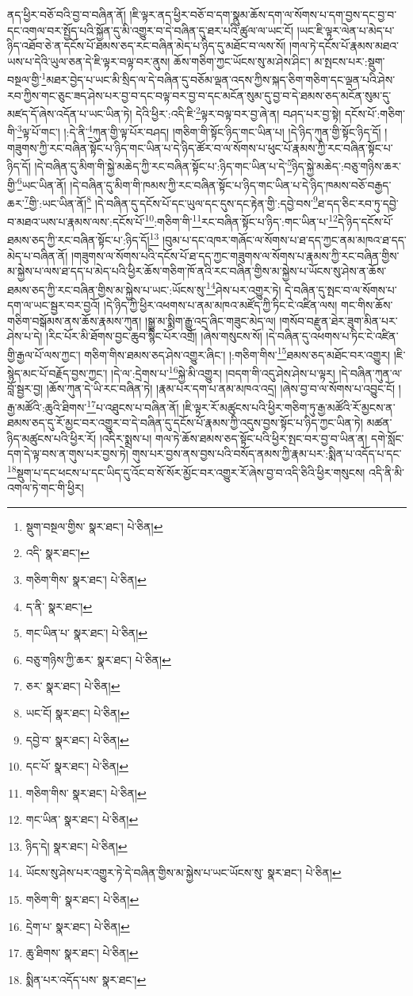 ནད་ཕྱིར་བཅོ་བའི་བྱ་བ་བཞིན་ནོ། །ཇི་ལྟར་ནད་ཕྱིར་བཅོ་བ་དག་སྣུམ་ཆོས་དག་ལ་སོགས་པ་དག་བྱས་དང་བྱ་བ་དང་འགལ་བར་སྤྱོད་པའི་སྐྱོན་དུ་མི་འགྱུར་བ་དེ་བཞིན་དུ་ཐར་པའི་ཚུལ་ལ་ཡང་ངོ། །ཡང་ཇི་ལྟར་ལེན་པ་མེད་པ་ཉིད་འཐོབ་ཅེ་ན་དངོས་པོ་ཐམས་ཅད་རང་བཞིན་མེད་པ་ཉིད་དུ་མཐོང་བ་ལས་སོ། །གལ་ཏེ་དངོས་པོ་རྣམས་མཐའ་ཡས་པ་དེའི་ཡུལ་ཅན་དེ་ཇི་ལྟར་བལྟ་བར་ནུས། ཆོས་གཅིག་ཀྱང་ཡོངས་སུ་མ་ཤེས་ཤིང་། མ་སྤངས་པར་:སྡུག་བསྔལ་གྱི་\footnote{སྡུག་བསྔལ་གྱིས་  སྣར་ཐང་།  པེ་ཅིན། }མཐར་བྱེད་པ་ཡང་མི་སྲིད་ལ་དེ་བཞིན་དུ་བཅོམ་ལྡན་འདས་ཀྱིས་སྐད་ཅིག་གཅིག་དང་ལྡན་པའི་ཤེས་རབ་ཀྱིས་གང་ཅུང་ཟད་ཤེས་པར་བྱ་བ་དང་བལྟ་བར་བྱ་བ་དང་མངོན་སུམ་དུ་བྱ་བ་དེ་ཐམས་ཅད་མངོན་སུམ་དུ་མཛད་དོ་ཞེས་འདོན་པ་ཡང་ཡིན་ཏེ། དེའི་ཕྱིར་:འདི་ཇི་\footnote{འདི་  སྣར་ཐང་། }ལྟར་བལྟ་བར་བྱ་ཞེ་ན། བཤད་པར་བྱ་སྟེ། དངོས་པོ་:གཅིག་གི་\footnote{གཅིག་གིས་  སྣར་ཐང་།  པེ་ཅིན། }ལྟ་པོ་གང་། །:དེ་ནི་\footnote{ད་ནི་  སྣར་ཐང་། }ཀུན་གྱི་ལྟ་པོར་བཤད། །གཅིག་གི་སྟོང་ཉིད་གང་ཡིན་པ། །དེ་ཉིད་ཀུན་གྱི་སྟོང་ཉིད་དོ། །གཟུགས་ཀྱི་རང་བཞིན་སྟོང་པ་ཉིད་གང་ཡིན་པ་དེ་ཉིད་ཚོར་བ་ལ་སོགས་པ་ཕུང་པོ་རྣམས་ཀྱི་རང་བཞིན་སྟོང་པ་ཉིད་དོ། །དེ་བཞིན་དུ་མིག་གི་སྐྱེ་མཆེད་ཀྱི་རང་བཞིན་སྟོང་པ་:ཉིད་གང་ཡིན་པ་དེ་\footnote{གང་ཡིན་པ་  སྣར་ཐང་།  པེ་ཅིན། }ཉིད་སྐྱེ་མཆེད་:བཅུ་གཉིས་ཆར་གྱི་\footnote{བཅུ་གཉིས་ཀྱི་ཆར་  སྣར་ཐང་།  པེ་ཅིན། }ཡང་ཡིན་ནོ། །དེ་བཞིན་དུ་མིག་གི་ཁམས་ཀྱི་རང་བཞིན་སྟོང་པ་ཉིད་གང་ཡིན་པ་དེ་ཉིད་ཁམས་བཅོ་བརྒྱད་ཆར་\footnote{ཅར་  སྣར་ཐང་།  པེ་ཅིན། }གྱི་:ཡང་ཡིན་ནོ།\footnote{ཡང་ངོ།  སྣར་ཐང་།  པེ་ཅིན། } །དེ་བཞིན་དུ་དངོས་པོ་དང་ཡུལ་དང་དུས་དང་རྟེན་གྱི་:དབྱེ་བས་\footnote{དབྱེ་བ་  སྣར་ཐང་།  པེ་ཅིན། }ཐ་དད་ཅིང་རབ་ཏུ་དབྱེ་བ་མཐའ་ཡས་པ་རྣམས་ལས་:དངོས་པོ་\footnote{དང་པོ་  སྣར་ཐང་།  པེ་ཅིན། }:གཅིག་གི་\footnote{གཅིག་གིས་  སྣར་ཐང་།  པེ་ཅིན། }རང་བཞིན་སྟོང་པ་ཉིད་:གང་ཡིན་པ་\footnote{གང་ཡིན་  སྣར་ཐང་།  པེ་ཅིན། }དེ་ཉིད་དངོས་པོ་ཐམས་ཅད་ཀྱི་རང་བཞིན་སྟོང་པ་:ཉིད་དོ།\footnote{ཉིད་དེ།  སྣར་ཐང་།  པེ་ཅིན། } །བུམ་པ་དང་འཁར་གཞོང་ལ་སོགས་པ་ཐ་དད་ཀྱང་ནམ་མཁའ་ཐ་དད་མེད་པ་བཞིན་ནོ། །གཟུགས་ལ་སོགས་པའི་དངོས་པོ་ཐ་དད་ཀྱང་གཟུགས་ལ་སོགས་པ་རྣམས་ཀྱི་རང་བཞིན་གྱིས་མ་སྐྱེས་པ་ལས་ཐ་དད་པ་མེད་པའི་ཕྱིར་ཆོས་གཅིག་ཁོ་ནའི་རང་བཞིན་གྱིས་མ་སྐྱེས་པ་ཡོངས་སུ་ཤེས་ན་ཆོས་ཐམས་ཅད་ཀྱི་རང་བཞིན་གྱིས་མ་སྐྱེས་པ་ཡང་:ཡོངས་སུ་\footnote{ཡོངས་སུ་ཤེས་པར་འགྱུར་ཏེ་དེ་བཞིན་གྱིས་མ་སྐྱེས་པ་ཡང་ཡོངས་སུ་  སྣར་ཐང་།  པེ་ཅིན། }ཤེས་པར་འགྱུར་ཏེ། དེ་བཞིན་དུ་སྤང་བ་ལ་སོགས་པ་དག་ལ་ཡང་སྦྱར་བར་བྱའོ། །དེ་ཉིད་ཀྱི་ཕྱིར་འཕགས་པ་ནམ་མཁའ་མཛོད་ཀྱི་ཏིང་ངེ་འཛིན་ལས། གང་གིས་ཆོས་གཅིག་བསྒོམས་ནས་ཆོས་རྣམས་ཀུན། །སྒྱུ་མ་སྨིག་རྒྱུ་འདྲ་ཞིང་གཟུང་མེད་ལ། །གསོབ་བརྫུན་ཐེར་ཟུག་མིན་པར་ཤེས་པ་དེ། །རིང་པོར་མི་ཐོགས་བྱང་ཆུབ་སྙིང་པོར་འགྲོ། །ཞེས་གསུངས་སོ། །དེ་བཞིན་དུ་འཕགས་པ་ཏིང་ངེ་འཛིན་གྱི་རྒྱལ་པོ་ལས་ཀྱང་། གཅིག་གིས་ཐམས་ཅད་ཤེས་འགྱུར་ཞིང་། །:གཅིག་གིས་\footnote{གཅིག་གི་  སྣར་ཐང་།  པེ་ཅིན། }ཐམས་ཅད་མཐོང་བར་འགྱུར། །ཇི་སྙེད་མང་པོ་བརྗོད་བྱས་ཀྱང་། །དེ་ལ་:དྲེགས་པ་\footnote{དྲེག་པ་  སྣར་ཐང་།  པེ་ཅིན། }སྐྱེ་མི་འགྱུར། །བདག་གི་འདུ་ཤེས་ཤེས་པ་ལྟར། །དེ་བཞིན་ཀུན་ལ་བློ་སྦྱར་བྱ། །ཆོས་ཀུན་དེ་ཡི་རང་བཞིན་ཏེ། །རྣམ་པར་དག་པ་ནམ་མཁའ་འདྲ། །ཞེས་བྱ་བ་ལ་སོགས་པ་འབྱུང་ངོ། །རྒྱ་མཚོའི་:ཆུའི་ཐིགས་\footnote{ཆུ་ཐིགས་  སྣར་ཐང་།  པེ་ཅིན། }པ་འཐུངས་པ་བཞིན་ནོ། །ཇི་ལྟར་རོ་མཚུངས་པའི་ཕྱིར་གཅིག་ཏུ་རྒྱ་མཚོའི་རོ་མྱངས་ན་ཐམས་ཅད་དུ་རོ་མྱང་བར་འགྱུར་བ་དེ་བཞིན་དུ་དངོས་པོ་རྣམས་ཀྱི་འདུས་བྱས་སྟོང་པ་ཉིད་ཀྱང་ཡིན་ཏེ། མཚན་ཉིད་མཚུངས་པའི་ཕྱིར་རོ། །འདིར་སྨྲས་པ། གལ་ཏེ་ཆོས་ཐམས་ཅད་སྟོང་པའི་ཕྱིར་སྤང་བར་བྱ་བ་ཡིན་ན། དགེ་སློང་དག་དེ་ལྟ་བས་ན་གུས་པར་བྱས་ཏེ། གུས་པར་བྱས་ནས་བྱས་པའི་བསོད་ནམས་ཀྱི་རྣམ་པར་:སྨིན་པ་འདོད་པ་དང་\footnote{སྨིན་པར་འདོད་པས་  སྣར་ཐང་། }སྡུག་པ་དང་ཕངས་པ་དང་ཡིད་དུ་འོང་བ་སོ་སོར་མྱོང་བར་འགྱུར་རོ་ཞེས་བྱ་བ་འདི་ཅིའི་ཕྱིར་གསུངས། འདི་ནི་མི་འགལ་ཏེ་གང་གི་ཕྱིར། 
